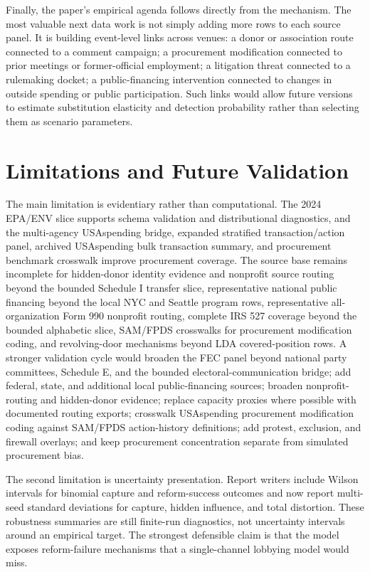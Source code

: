 Finally, the paper's empirical agenda follows directly from the mechanism. The most valuable next data work is not simply adding more rows to each source panel. It is building event-level links across venues: a donor or association route connected to a comment campaign; a procurement modification connected to prior meetings or former-official employment; a litigation threat connected to a rulemaking docket; a public-financing intervention connected to changes in outside spending or public participation. Such links would allow future versions to estimate substitution elasticity and detection probability rather than selecting them as scenario parameters.

\section{Limitations and Future Validation}

The main limitation is evidentiary rather than computational. The 2024 EPA/ENV slice supports schema validation and distributional diagnostics, and the multi-agency USAspending bridge, expanded stratified transaction/action panel, archived USAspending bulk transaction summary, and procurement benchmark crosswalk improve procurement coverage. The source base remains incomplete for hidden-donor identity evidence and nonprofit source routing beyond the bounded Schedule I transfer slice, representative national public financing beyond the local NYC and Seattle program rows, representative all-organization Form 990 nonprofit routing, complete IRS 527 coverage beyond the bounded alphabetic slice, SAM/FPDS crosswalks for procurement modification coding, and revolving-door mechanisms beyond LDA covered-position rows. A stronger validation cycle would broaden the FEC panel beyond national party committees, Schedule E, and the bounded electoral-communication bridge; add federal, state, and additional local public-financing sources; broaden nonprofit-routing and hidden-donor evidence; replace capacity proxies where possible with documented routing exports; crosswalk USAspending procurement modification coding against SAM/FPDS action-history definitions; add protest, exclusion, and firewall overlays; and keep procurement concentration separate from simulated procurement bias.

The second limitation is uncertainty presentation. Report writers include Wilson intervals for binomial capture and reform-success outcomes and now report multi-seed standard deviations for capture, hidden influence, and total distortion. These robustness summaries are still finite-run diagnostics, not uncertainty intervals around an empirical target. The strongest defensible claim is that the model exposes reform-failure mechanisms that a single-channel lobbying model would miss.


